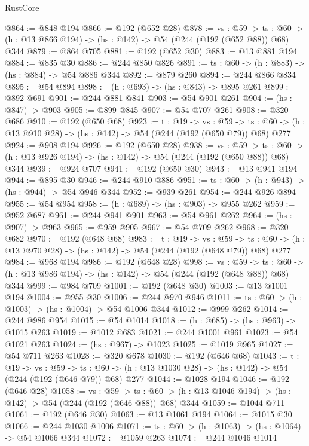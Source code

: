 \begin{lexlean}{RustCore}
\begin{coremodule}
@864 := @848 @194
@866 := @192 (@652 @28)
@878 := {vs : @59} ->
  {ts : @60} -> (h : @13 @866 @194) -> (hs : @142) -> @54 (@244 (@192 (@652 @88)) @68) @344
@879 := @864 @705
@881 := @192 (@652 @30)
@883 := @13 @881 @194
@884 := @835 @30
@886 := @244 @850 @826
@891 := {ts : @60} -> (h : @883) -> (hs : @884) -> @54 @886 @344
@892 := @879 @260
@894 := @244 @866 @834
@895 := @54 @894
@898 := (h : @693) -> (hs : @843) -> @895 @261
@899 := @892 @691
@901 := @244 @881 @841
@903 := @54 @901 @261
@904 := (hs : @847) -> @903
@905 := @899 @845
@907 := @54 @707 @261
@908 := @320 @686
@910 := @192 (@650 @68)
@923 := {t : @19} ->
  {vs : @59} ->
  {ts : @60} -> (h : @13 @910 @28) -> (hs : @142) -> @54 (@244 (@192 (@650 @79)) @68) @277
@924 := @908 @194
@926 := @192 (@650 @28)
@938 := {vs : @59} ->
  {ts : @60} -> (h : @13 @926 @194) -> (hs : @142) -> @54 (@244 (@192 (@650 @88)) @68) @344
@939 := @924 @707
@941 := @192 (@650 @30)
@943 := @13 @941 @194
@944 := @895 @30
@946 := @244 @910 @886
@951 := {ts : @60} -> (h : @943) -> (hs : @944) -> @54 @946 @344
@952 := @939 @261
@954 := @244 @926 @894
@955 := @54 @954
@958 := (h : @689) -> (hs : @903) -> @955 @262
@959 := @952 @687
@961 := @244 @941 @901
@963 := @54 @961 @262
@964 := (hs : @907) -> @963
@965 := @959 @905
@967 := @54 @709 @262
@968 := @320 @682
@970 := @192 (@648 @68)
@983 := {t : @19} ->
  {vs : @59} ->
  {ts : @60} -> (h : @13 @970 @28) -> (hs : @142) -> @54 (@244 (@192 (@648 @79)) @68) @277
@984 := @968 @194
@986 := @192 (@648 @28)
@998 := {vs : @59} ->
  {ts : @60} -> (h : @13 @986 @194) -> (hs : @142) -> @54 (@244 (@192 (@648 @88)) @68) @344
@999 := @984 @709
@1001 := @192 (@648 @30)
@1003 := @13 @1001 @194
@1004 := @955 @30
@1006 := @244 @970 @946
@1011 := {ts : @60} -> (h : @1003) -> (hs : @1004) -> @54 @1006 @344
@1012 := @999 @262
@1014 := @244 @986 @954
@1015 := @54 @1014
@1018 := (h : @685) -> (hs : @963) -> @1015 @263
@1019 := @1012 @683
@1021 := @244 @1001 @961
@1023 := @54 @1021 @263
@1024 := (hs : @967) -> @1023
@1025 := @1019 @965
@1027 := @54 @711 @263
@1028 := @320 @678
@1030 := @192 (@646 @68)
@1043 := {t : @19} ->
  {vs : @59} ->
  {ts : @60} -> (h : @13 @1030 @28) -> (hs : @142) -> @54 (@244 (@192 (@646 @79)) @68) @277
@1044 := @1028 @194
@1046 := @192 (@646 @28)
@1058 := {vs : @59} ->
  {ts : @60} -> (h : @13 @1046 @194) -> (hs : @142) -> @54 (@244 (@192 (@646 @88)) @68) @344
@1059 := @1044 @711
@1061 := @192 (@646 @30)
@1063 := @13 @1061 @194
@1064 := @1015 @30
@1066 := @244 @1030 @1006
@1071 := {ts : @60} -> (h : @1063) -> (hs : @1064) -> @54 @1066 @344
@1072 := @1059 @263
@1074 := @244 @1046 @1014

\end{coremodule}
\end{lexlean}
